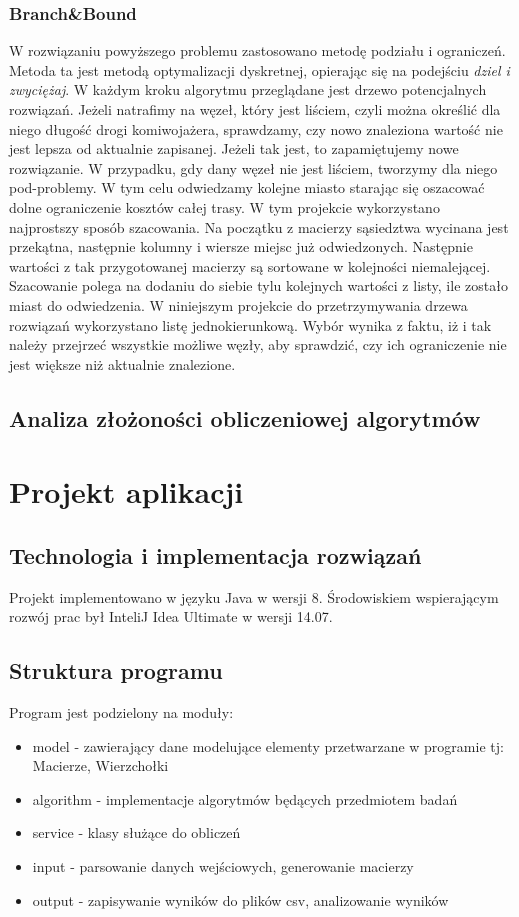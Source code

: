 \documentclass{article}
\begin{document}
		\subsubsection{Branch\&Bound}
			
				W rozwiązaniu powyższego problemu zastosowano metodę podziału i ograniczeń. Metoda ta jest metodą optymalizacji dyskretnej, opierając się na podejściu \textit{dziel i zwyciężaj}.
				W każdym kroku algorytmu przeglądane jest drzewo potencjalnych rozwiązań. Jeżeli natrafimy na węzeł, który jest liściem, czyli można określić dla niego długość drogi komiwojażera, sprawdzamy, czy nowo znaleziona wartość nie jest lepsza od aktualnie zapisanej. Jeżeli tak jest, to zapamiętujemy nowe rozwiązanie. W przypadku, gdy dany węzeł nie jest liściem, tworzymy dla niego pod-problemy. W tym celu odwiedzamy kolejne miasto starając się oszacować dolne ograniczenie kosztów całej trasy. W tym projekcie wykorzystano najprostszy sposób szacowania. Na początku z macierzy sąsiedztwa wycinana jest przekątna, następnie kolumny i wiersze miejsc już odwiedzonych. Następnie wartości z tak przygotowanej macierzy są sortowane w kolejności niemalejącej. Szacowanie polega na dodaniu do siebie tylu kolejnych wartości z listy, ile zostało miast do odwiedzenia. W niniejszym projekcie do przetrzymywania drzewa rozwiązań wykorzystano listę jednokierunkową. Wybór wynika z faktu, iż i tak należy przejrzeć wszystkie możliwe węzły, aby sprawdzić, czy ich ograniczenie nie jest większe niż aktualnie znalezione.
	\subsection{Analiza złożoności obliczeniowej algorytmów}

\section{Projekt aplikacji}	
	\subsection{Technologia i implementacja rozwiązań}	
	Projekt implementowano 	w języku Java w wersji 8. Środowiskiem wspierającym rozwój prac był InteliJ Idea Ultimate w wersji 14.07.   	
		\subsection{Struktura programu}	
		Program jest podzielony na moduły:
		\begin{itemize}
			\item model - zawierający dane modelujące elementy przetwarzane w programie tj: Macierze, Wierzchołki
			\item algorithm - implementacje algorytmów będących przedmiotem badań
			\item service - klasy służące do obliczeń
			\item input - parsowanie danych wejściowych, generowanie macierzy
			\item output - zapisywanie wyników do plików csv, analizowanie wyników
		\end{itemize}
\end{document}
